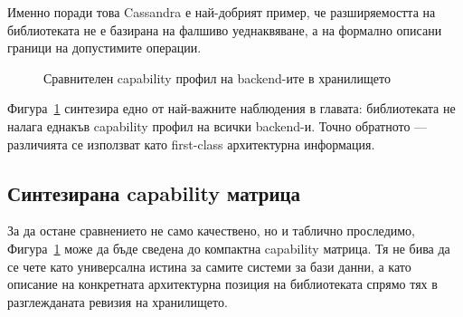 Именно поради това Cassandra е най-добрият пример, че разширяемостта на библиотеката не е базирана на фалшиво уеднаквяване, а на формално описани граници на допустимите операции.

\begin{figure}[H]
\centering
{}
\caption{Сравнителен capability профил на backend-ите в хранилището}
\label{fig:backend_capability_spectrum}
\end{figure}

Фигура~\ref{fig:backend_capability_spectrum} синтезира едно от най-важните наблюдения в главата: библиотеката не налага еднакъв capability профил на всички backend-и. Точно обратното --- различията се използват като first-class архитектурна информация.

\subsection{Синтезирана capability матрица}

За да остане сравнението не само качествено, но и таблично проследимо, Фигура~\ref{fig:backend_capability_spectrum} може да бъде сведена до компактна capability матрица. Тя не бива да се чете като универсална истина за самите системи за бази данни, а като описание на конкретната архитектурна позиция на библиотеката спрямо тях в разглежданата ревизия на хранилището.

